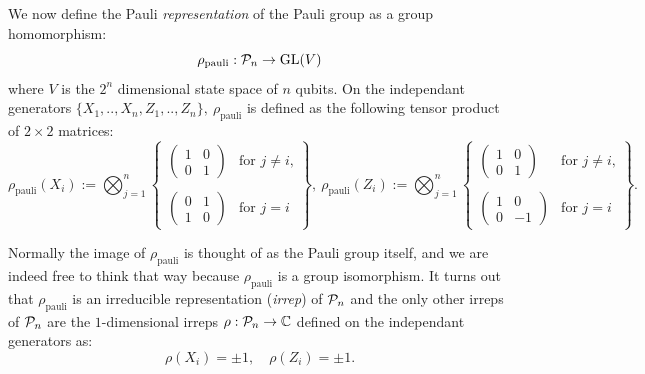 \documentclass[12pt,notitlepage,longbibliography,nofootinbib,tightenlines]{revtex4}
\begin{document}
We now define the
Pauli {\it representation} 
of the Pauli group as a group homomorphism:
$$
    \rho_{\mathrm{pauli}} : \mathcal{P}_n \to \mathrm{GL}(V)
$$
where $V$ is the $2^n$ dimensional state space of $n$ qubits.
On the independant generators 
$\{X_1, .., X_n, Z_1, .., Z_n\},\ \rho_{\mathrm{pauli}}$
is defined as the following tensor product of $2\times 2$ matrices:
$$
\rho_{\mathrm{pauli}}(X_i) := \bigotimes_{j=1}^n \left\{ \begin{array}{ll}
\left( \begin{array}{ll}
1&0\\
0&1\end{array} \right) &\mbox{for $j\ne i$,}\\
\\
\left( \begin{array}{ll}
0&1\\
1&0\end{array} \right) &\mbox{for $j=i$} \end{array}
\right\},\ 
\rho_{\mathrm{pauli}}(Z_i) := \bigotimes_{j=1}^n \left\{ \begin{array}{ll}
\left( \begin{array}{ll}
1&0\\
0&1\end{array} \right) &\mbox{for $j\ne i$,}\\
\\
\left( \begin{array}{rr}
1&0\\
0&-1\end{array} \right) &\mbox{for $j=i$}\end{array}
\right\}.
$$


Normally the image of 
$\rho_{\mathrm{pauli}}$ is thought of as the
Pauli group itself, and we are indeed free to think
that way because $\rho_{\mathrm{pauli}}$ is a group
isomorphism.
It turns out that $\rho_{\mathrm{pauli}}$ is an
irreducible representation ({\it irrep}) of $\mathcal{P}_n$ and the
only other irreps of $\mathcal{P}_n$ are 
the $1$-dimensional irreps $\rho:\mathcal{P}_n\to\mathbb{C}$
defined on the independant generators as:
    $$ \rho(X_i) = \pm 1,\quad \rho(Z_i) = \pm 1.$$
\end{document}
